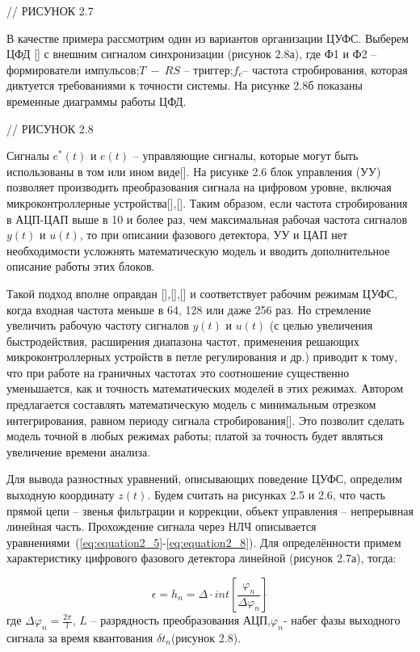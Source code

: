 // РИСУНОК 2.7\par
В качестве примера рассмотрим один из вариантов организации ЦУФС. Выберем ЦФД [] с внешним сигналом синхронизации (рисунок 2.8а), где Ф1 и Ф2 – формирователи импульсов;$ T~-~RS$ – триггер;$ f_c $– частота стробирования, которая диктуется требованиями к точности системы. На рисунке 2.8б показаны временные диаграммы работы ЦФД.\par
// РИСУНОК 2.8\par
Сигналы $e^*(t)$ и $e(t)$ – управляющие сигналы, которые могут быть использованы в том или ином виде[]. На рисунке 2.6 блок управления (УУ) позволяет производить преобразования сигнала на цифровом уровне, включая микроконтроллерные устройства[],[].
Таким образом, если частота стробирования в АЦП-ЦАП выше в 10 и более раз, чем максимальная рабочая частота сигналов $y(t)$ и $u(t)$, то при описании фазового детектора, УУ и ЦАП нет необходимости усложнять математическую модель и вводить дополнительное описание работы этих блоков.\par
Такой подход вполне оправдан [],[],[] и соответствует рабочим режимам ЦУФС, когда входная частота меньше в 64, 128 или даже 256 раз. Но стремление увеличить рабочую частоту сигналов $y(t)$ и $u(t)$ (с целью увеличения быстродействия, расширения диапазона частот, применения решающих микроконтроллерных устройств в петле регулирования и др.) приводит к тому, что при работе на граничных частотах это соотношение существенно уменьшается, как и точность математических моделей в этих режимах. Автором предлагается составлять математическую модель с минимальным отрезком интегрирования, равном периоду сигнала стробирования[]. Это позволит сделать модель точной в любых режимах работы; платой за точность будет являться увеличение времени анализа.\par
Для вывода разностных уравнений, описывающих поведение ЦУФС, определим выходную координату $z(t)$. Будем считать на рисунках 2.5 и 2.6, что часть прямой цепи – звенья фильтрации и коррекции, объект управления – непрерывная линейная часть. Прохождение сигнала через НЛЧ описывается уравнениями~(\ref{eq:equation2_5}-\ref{eq:equation2_8}). Для определённости примем характеристику цифрового фазового детектора линейной (рисунок 2.7а), тогда:\par
\begin{equation}
\label{eq:equation2_19}
\epsilon=h_n=\Delta\cdot int\left[ \frac{\varphi_n}{\Delta\varphi_n}\right]\grave{}
\end{equation}
\noindent где $\Delta\varphi_n =  \frac{2\pi}{l}$, $L$ – разрядность преобразования АЦП,$ \varphi_n$- набег фазы выходного сигнала за время квантования $\delta t_n$(рисунок 2.8). \par
